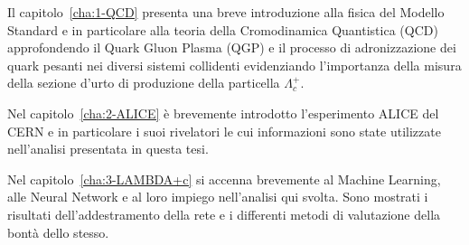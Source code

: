 \begin{comment}
Nel presente lavoro di tesi il barione $\Lambda^{+}_{c}$ è stato ricostruito attraverso il suo decadimento $\Lambda_{c}^{+} \to p K^{0}_{S}$ utilizzando i dati raccolti dall’esperimento ALICE in collisioni $pp$ ad una energia del centro di massa di $\sqrt{s} =$ \qty{13}{TeV}. L’analisi si è concentrata nell’intervallo di impulso trasverso $1 < p_{T} < 2$ \unit{\giga \eV \per \clight} poichè a basso $p_{T}$ i vari modelli teorici mostrano una certa discrepanza nelle loro previsioni ed è quindi possibile attraverso l’analisi dei dati sperimentali valutare l’attendibilità di tali previsioni così come fornire input per correzioni ai vari modelli. Data la difficoltà di questa misura, sono state utilizzate tecniche di Machine Learning per mezzo dell'allenamento di una Rete Neurale. In particolare sono state utilizzate le librerie open source TensorFlow e l’API Keras creando un pacchetto indipendente da quelli già esistenti, come TMVA di ROOT, personalizzabile e ampliabile a piacimento.
\end{comment}

Il capitolo~\ref{cha:1-QCD} presenta una breve introduzione alla fisica del Modello  Standard e in particolare alla teoria della Cromodinamica Quantistica (QCD) approfondendo il Quark Gluon Plasma (QGP) e il processo di adronizzazione dei quark pesanti nei diversi sistemi collidenti evidenziando l’importanza della misura della sezione d’urto di produzione della particella $\Lambda^{+}_{c}$.

Nel capitolo~\ref{cha:2-ALICE} è brevemente introdotto l’esperimento ALICE del CERN e in particolare i suoi rivelatori le cui informazioni sono state utilizzate nell’analisi presentata in questa tesi.

Nel capitolo~\ref{cha:3-LAMBDA+c} si accenna brevemente al Machine Learning, alle Neural Network e al loro impiego nell'analisi qui svolta. Sono mostrati i risultati dell'addestramento della rete e i differenti metodi di valutazione della bontà dello stesso.

\newpage